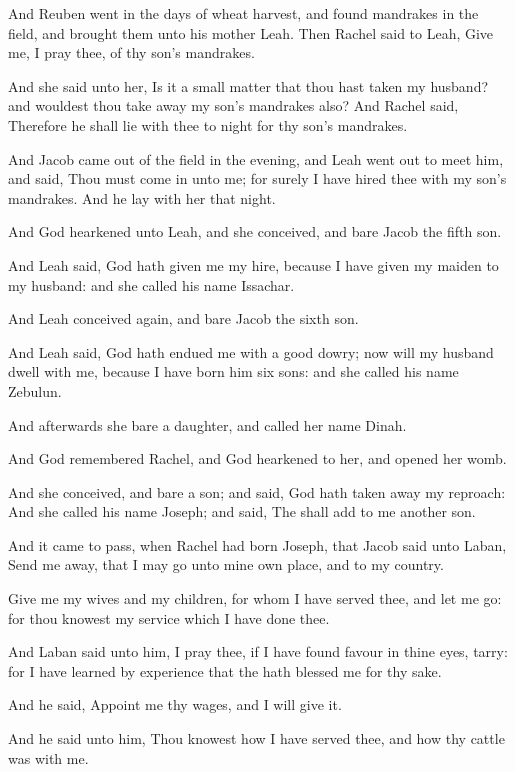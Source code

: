 \Verse And Reuben went in the days of wheat harvest, and found mandrakes in the field, and brought them unto his mother Leah. Then Rachel said to Leah, Give me, I pray thee, of thy son's mandrakes.

\Verse And she said unto her, Is it a small matter that thou hast taken my husband? and wouldest thou take away my son's mandrakes also? And Rachel said, Therefore he shall lie with thee to night for thy son's mandrakes.

\Verse And Jacob came out of the field in the evening, and Leah went out to meet him, and said, Thou must come in unto me; for surely I have hired thee with my son's mandrakes. And he lay with her that night.

\Verse And God hearkened unto Leah, and she conceived, and bare Jacob the fifth son.

\Verse And Leah said, God hath given me my hire, because I have given my maiden to my husband: and she called his name Issachar.

\Verse And Leah conceived again, and bare Jacob the sixth son.

\Verse And Leah said, God hath endued me with a good dowry; now will my husband dwell with me, because I have born him six sons: and she called his name Zebulun.

\Verse And afterwards she bare a daughter, and called her name Dinah.

\Verse And God remembered Rachel, and God hearkened to her, and opened her womb.

\Verse And she conceived, and bare a son; and said, God hath taken away my reproach: \Verse And she called his name Joseph; and said, The \LORD shall add to me another son.

\Verse And it came to pass, when Rachel had born Joseph, that Jacob said unto Laban, Send me away, that I may go unto mine own place, and to my country.

\Verse Give me my wives and my children, for whom I have served thee, and let me go: for thou knowest my service which I have done thee.

\Verse And Laban said unto him, I pray thee, if I have found favour in thine eyes, tarry: for I have learned by experience that the \LORD hath blessed me for thy sake.

\Verse And he said, Appoint me thy wages, and I will give it.

\Verse And he said unto him, Thou knowest how I have served thee, and how thy cattle was with me.

